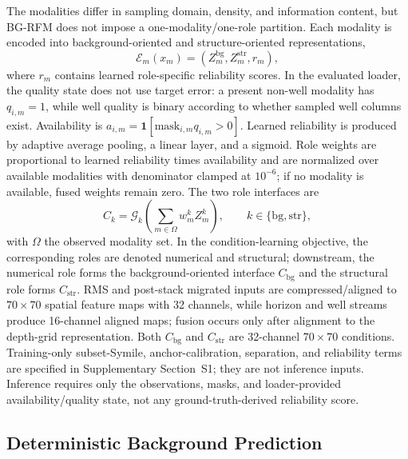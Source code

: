 The modalities differ in sampling domain, density, and information content, but BG-RFM does not impose a one-modality/one-role partition. Each modality is encoded into background-oriented and structure-oriented representations,
\begin{equation}
\mathcal E_m(x_m)=\left(Z_m^{\mathrm{bg}},Z_m^{\mathrm{str}},r_m\right),
\end{equation}
where $r_m$ contains learned role-specific reliability scores. In the evaluated loader, the quality state does not use target error: a present non-well modality has $q_{i,m}=1$, while well quality is binary according to whether sampled well columns exist. Availability is $a_{i,m}=\mathbf{1}[\mathrm{mask}_{i,m}q_{i,m}>0]$. Learned reliability is produced by adaptive average pooling, a linear layer, and a sigmoid. Role weights are proportional to learned reliability times availability and are normalized over available modalities with denominator clamped at $10^{-6}$; if no modality is available, fused weights remain zero. The two role interfaces are
\begin{equation}
C_k=\mathcal G_k\left(\sum_{m\in\Omega}w_m^k Z_m^k\right),
\qquad k\in\{\mathrm{bg},\mathrm{str}\},
\end{equation}
with $\Omega$ the observed modality set. In the condition-learning objective, the corresponding roles are denoted numerical and structural; downstream, the numerical role forms the background-oriented interface $C_{\mathrm{bg}}$ and the structural role forms $C_{\mathrm{str}}$. RMS and post-stack migrated inputs are compressed/aligned to $70\times70$ spatial feature maps with 32 channels, while horizon and well streams produce 16-channel aligned maps; fusion occurs only after alignment to the depth-grid representation. Both $C_{\mathrm{bg}}$ and $C_{\mathrm{str}}$ are 32-channel $70\times70$ conditions. Training-only subset-Symile, anchor-calibration, separation, and reliability terms are specified in Supplementary Section~S1; they are not inference inputs. Inference requires only the observations, masks, and loader-provided availability/quality state, not any ground-truth-derived reliability score.



\subsection{Deterministic Background Prediction}

